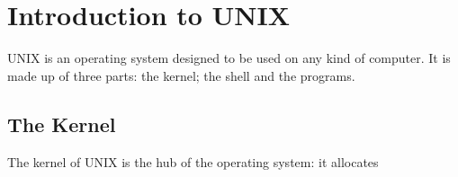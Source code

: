 \chapter{Introduction to UNIX}

UNIX is an operating system designed to be used on any kind of computer. It is made up of three parts: the kernel; the shell and the programs.

	\section{The Kernel}
		The kernel of UNIX is the hub of the operating system: it allocates 